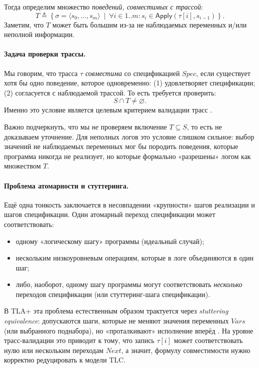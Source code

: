 Тогда определим множество \emph{поведений, совместимых с трассой}:
\[
T \triangleq \left\{ \sigma=\langle s_0,\dots,s_m\rangle \ \middle|\
\forall i \in 1..m: s_i \in \mathsf{Apply}(\tau[i], s_{i-1}) \right\}.
\]
Заметим, что $T$ может быть большим из-за не наблюдаемых переменных и/или
неполной информации.

\paragraph{Задача проверки трассы.}
Мы говорим, что трасса $\tau$ \emph{совместима} со спецификацией $\mathit{Spec}$,
если существует хотя бы одно поведение, которое одновременно:
(1) удовлетворяет спецификации; (2) согласуется с наблюдаемой трассой.
То есть требуется проверить:
\[
S \cap T \neq \varnothing.
\]
Именно это условие является целевым критерием валидации трасс
\cite{HowardTraceChecking2011,CirsteaKuppeLoillierMerz2024}.

Важно подчеркнуть, что мы \emph{не} проверяем включение $T \subseteq S$,
то есть не доказываем уточнение. Для неполных логов это условие слишком сильное:
выбор значений не наблюдаемых переменных мог бы породить поведения,
которые программа никогда не реализует, но которые формально «разрешены»
логом как множеством $T$.

\paragraph{Проблема атомарности и стуттеринга.}
Ещё одна тонкость заключается в несовпадении «крупности» шагов реализации и
шагов спецификации. Один атомарный переход спецификации может соответствовать:
\begin{itemize}
  \item одному «логическому шагу» программы (идеальный случай);
  \item нескольким низкоуровневым операциям, которые в логе объединяются в один шаг;
  \item либо, наоборот, одному шагу программы могут соответствовать \emph{несколько}
        переходов спецификации (или стуттеринг-шага спецификации).
\end{itemize}
В TLA+ эта проблема естественным образом трактуется через
\emph{stuttering equivalence}: допускаются шаги, которые не меняют значения
переменных $Vars$ (или выбранного поднабора), но «проталкивают» исполнение
вперёд \cite{LamportSpecifyingSystems2002}. На уровне трасс-валидации это приводит к тому,
что запись $\tau[i]$ может соответствовать нулю или нескольким переходам $\mathit{Next}$,
а значит, формулу совместимости нужно корректно редуцировать к модели TLC.

